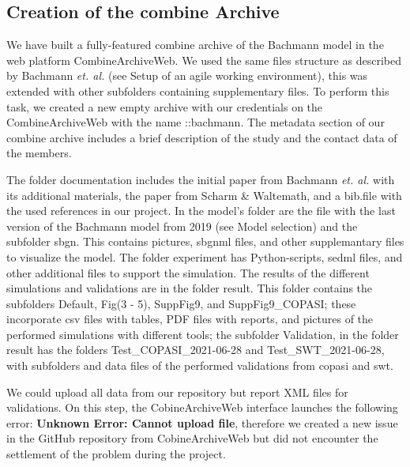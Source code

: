 \subsection*{Creation of the \acs{combine} Archive}

We have built a fully-featured \ac{combine} archive of the Bachmann model in the web platform CombineArchiveWeb. We used the same files structure as described by Bachmann \textit{et. al.} (see Setup of an agile working environment), this was extended with other subfolders containing supplementary files. To perform this task, we created a new empty archive with our credentials on the CombineArchiveWeb with the name \textsf{::bachmann}. The metadata section of our \ac{combine} archive includes a brief description of the study and the contact data of the members.

The folder documentation includes the initial paper from Bachmann \textit{et. al.}  with its additional materials, the paper from Scharm \& Waltemath, and a \textsf{bib.file} with the used references in our project. In the model's folder are the file with the last version of the Bachmann model from 2019 (see Model selection) and the subfolder \textsf{sbgn}. This contains pictures, \ac{sbgnml} files, and other supplemantary files to visualize the model. The folder experiment has Python-scripts, \ac{sedml} files, and other additional files to support the simulation. The results of the different simulations and validations are in the folder result. This folder contains the subfolders Default, Fig(3 - 5), SuppFig9, and SuppFig9\_COPASI; these incorporate \ac{csv} files with tables, PDF files with reports, and pictures of the performed simulations with different tools; the subfolder Validation, in the folder result has the folders Test\_COPASI\_2021-06-28 and Test\_SWT\_2021-06-28, with subfolders and data files of the performed validations from \ac{copasi} and \ac{swt}.

We could upload all data from our repository but report XML files for validations. On this step, the CobineArchiveWeb interface launches the following error: \textbf{Unknown Error: Cannot upload file}, therefore we created a new issue in the GitHub repository from CobineArchiveWeb but did not encounter the settlement of the problem during the project.